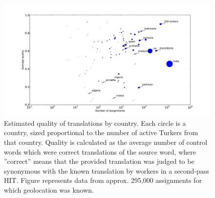 \documentclass[11pt]{article}
\begin{document}

%
%

\begin{figure}[h]
\begin{center}
\includegraphics[width=.8\linewidth]{final-figures/quality-scatter}
\end{center}

\caption{Estimated quality of translations by country. Each circle is a country, sized proportional to the number of active Turkers from that country. Quality is calculated as the average number of control words which were correct translations of the source word, where ”correct” means that the provided translation was judged to be synonymous with the known translation by workers in a second-pass HIT. Figure represents data from approx. 295,000 assignments for which geolocation was known.}
\label{quality-scatter}
\end{figure}
\end{document}
